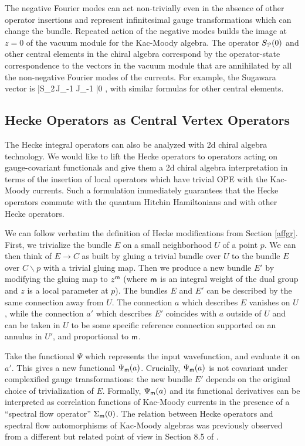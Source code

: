 \documentclass[11pt,a4paper]{article}
\begin{document}
The negative Fourier modes can act non-trivially even in the absence of other operator insertions 
and represent infinitesimal gauge transformations which can change the bundle. 
Repeated action of the negative modes builds the image at $z=0$ of the vacuum module for the Kac-Moody algebra.
The operator 
$S_{\cal P}(0)$ and other central elements in the chiral algebra correspond by the operator-state correspondence to the vectors in the 
vacuum module that are annihilated by all the non-negative Fourier modes of the currents. For example, the Sugawara vector  is 
\be
|S_2\rangle \equiv \Tr \,J_{-1} J_{-1} |0 \rangle,
\ee with similar formulas for other central elements.

\subsection{Hecke Operators as Central Vertex Operators}\label{cvo}

The  Hecke integral operators can also be analyzed with 2d chiral algebra technology. We would like to lift the Hecke operators to operators acting on gauge-covariant functionals and give them a 2d chiral algebra interpretation in terms of the insertion of  local operators which have trivial OPE with the Kac-Moody currents. Such a formulation  immediately guarantees that the Hecke operators commute with the quantum Hitchin Hamiltonians
and with other Hecke operators. 

We can follow verbatim the definition of Hecke modifications from Section \ref{affgr}. First, we trivialize the bundle $E$ on a  small neighborhood $U$ of a point $p$. We can then think of $E\to C$
as built by gluing a trivial bundle over $U$ to the bundle $E$ over $C\backslash p$ with a trivial gluing map.  Then we produce a new bundle $E'$ by modifying the gluing map to $z^{\sf m}$ (where ${\sf m}$ is an integral weight of the dual group and $z$ is a local parameter at $p$). The bundles $E$ and $E'$ can be described by the same connection away from $U$. The connection $a$ which describes $E$ vanishes on $U$, while the connection $a'$ which describes $E'$ coincides with $a$ outside of $U$
and can be taken in $U$ to be some specific reference connection supported on an annulus in $U'$, and proportional to  ${\sf m}$.  

Take the functional $\Psi$ which represents the input wavefunction, and evaluate it on $a'$. This gives a new functional $\Psi_{{\sf m}}(a)$. 
Crucially, $\Psi_{\sf m}(a)$ is not covariant under complexified gauge transformations: the new bundle $E'$ depends on the original choice 
of trivialization of $E$. Formally, $\Psi_{\sf m}(a)$ and its functional derivatives can be interpreted as correlation functions of Kac-Moody currents in the presence of a ``spectral flow operator'' $\Sigma_{{\sf m}}(0)$.   The relation between Hecke operators and spectral flow automorphisms of Kac-Moody algebras was previously observed
from a different but related point of view in Section 8.5 of \cite{Teschner:2010je}.
\end{document}
